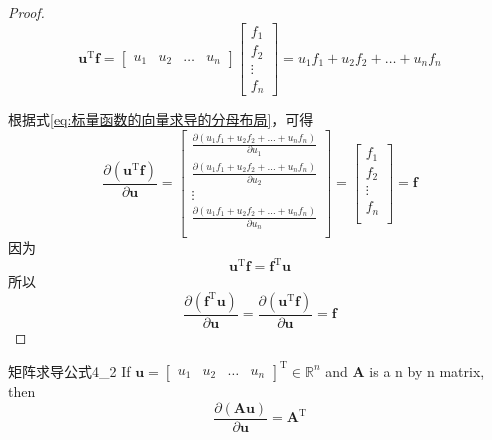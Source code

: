 \documentclass[withoutpreface,bwprint]{NoteBook}
\begin{document}
\begin{proof}
\begin{equation}
    \mathbf{u}^\mathrm{T}\mathbf{f}=
    \begin{bmatrix} 
    u_1 & u_2 & \dots & u_n
    \end{bmatrix}
    \begin{bmatrix} 
    f_1 \\
    f_2 \\ 
    \vdots \\ 
    f_n
    \end{bmatrix}
    =u_1 f_1 + u_2 f_2 + \dots + u_n f_n
\end{equation}

根据式\cref{eq:标量函数的向量求导的分母布局}，可得
\begin{equation}
    \frac{\partial (\mathbf{u}^\mathrm{T}\mathbf{f})}{\partial \mathbf{u}} 
    =
    \begin{bmatrix} 
    \frac{\partial (u_1 f_1 + u_2 f_2 + \dots + u_n f_n)}{\partial u_1} \\
    \frac{\partial (u_1 f_1 + u_2 f_2 + \dots + u_n f_n)}{\partial u_2} \\
    \vdots \\
    \frac{\partial (u_1 f_1 + u_2 f_2 + \dots + u_n f_n)}{\partial u_n} \\
    \end{bmatrix} 
    =
    \begin{bmatrix} 
    f_1 \\
    f_2 \\
    \vdots \\
    f_n \\
    \end{bmatrix} 
    =
    \mathbf{f}
\end{equation}
因为    
$$
\mathbf{u}^\mathrm{T}\mathbf{f}
=
\mathbf{f}^\mathrm{T}\mathbf{u}
$$
所以
\begin{equation}
    \frac{\partial (\mathbf{f}^\mathrm{T}\mathbf{u})}{\partial \mathbf{u}} 
    =
    \frac{\partial (\mathbf{u}^\mathrm{T}\mathbf{f})}{\partial \mathbf{u}} 
    =
    \mathbf{f}    
\end{equation}
    
\end{proof}

\begin{matrixDerivativeEquation}
    {}
    {矩阵求导公式4_2}
    If
    $\mathbf{u}=
    \begin{bmatrix}
        u_1 & u_2 & \dots & u_n     
    \end{bmatrix}^\mathrm{T} \in \mathbb{R}^n$ and
    $\mathbf{A}$ is a n by n matrix, then
    $$
    \frac{\partial (\mathbf{A}\mathbf{u})}{\partial \mathbf{u}} 
    =
    \mathbf{A}^\mathrm{T}
    $$
    
\end{matrixDerivativeEquation}
\end{document}
